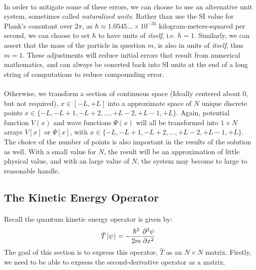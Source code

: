 \documentclass[12pt,letterpaper]{book}
\begin{document}
\paragraph*{}In order to mitigate some of these errors, we can choose to use an alternative unit system, sometimes called \textit{naturalized units}. Rather than use the SI value for Plank's consntant over $2\pi$, as $\hbar \approx 1.0545...\times 10^{-34}$ kilogram-meters-squared per second, we can choose to set $\hbar$ to have units of \textit{itself}, i.e. $\hbar = 1$. Similarly, we can assert that the mass of the particle in question $m$, is also in units of \textit{itself}, thus $m = 1$.  These adjustments will reduce initial errors that result from numerical mathematics, and can always be conerted back into SI units at the end of a long string of computations to reduce compounding error.

\paragraph*{}Otherwise, we transform a section of continuous space (Ideally centered about $0$, but not required), $x \in [-L , +L]$ into a approximate space of $N$ unique discrete points $x \in \{-L , -L+1, -L+2 , ... , +L-2 , +L-1, +L\}$. Again, potential function $V(x)$ and wave functions $\Psi(x)$ will all be transformed into $1 \times N$ arrays $V[x]$ or $\Psi[x]$, with $x \in \{-L , -L+1, -L+2 , ... , +L-2 , +L-1, +L\}$. The choice of the number of points is also important in the results of the solution as well. With a small value for $N$, the result will be an approximation of little physical value, and with an large value of $N$, the system may become to large to reasonable handle.


\subsection{The Kinetic Energy Operator}

\paragraph*{}Recall the quantum kinetic energy operator is given by:
\begin{equation}
\label{KE}
\hat{T}\ket{\psi} = -\frac{\hbar^2}{2m}\frac{\partial^2 \psi}{\partial x^2}
\end{equation}
The goal of this section is to express this operator, $\hat{T}$ as an $N \times N$ matrix. Firstly, we need to be able to express the second-derivative operator as a matrix. 
\end{document}
